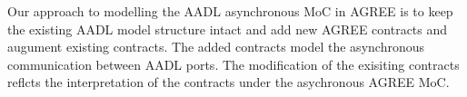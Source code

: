 

Our approach to modelling the AADL asynchronous MoC in AGREE is to keep the existing AADL model structure intact and add new AGREE contracts and augument existing contracts. The added contracts model the asynchronous communication between AADL ports. The modification of the exisiting contracts reflcts the interpretation of the contracts under the asychronous AGREE MoC. 



